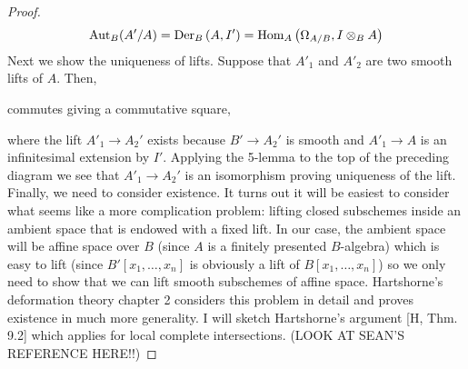 \documentclass[12pt]{article}
\begin{document}
\begin{proof}
\[ \mathrm{Aut}_B(A'/A) = \Der[B]{A}{I'} = \Hom{A}{\Omega_{A/B}}{I \otimes_B A} \]
Next we show the uniqueness of lifts. Suppose that $A'_1$ and $A'_2$ are two smooth lifts of $A$. Then,
\begin{center}
\end{center}
commutes giving a commutative square,
\begin{center}
\end{center}
where the lift $A'_1 \to A_2'$ exists because $B' \to A_2'$ is smooth and $A'_1 \to A$ is an infinitesimal extension by $I'$. Applying the 5-lemma to the top of the preceding diagram we see that $A'_1 \to A_2'$ is an isomorphism proving uniqueness of the lift.
\bigskip\\
Finally, we need to consider existence. It turns out it will be easiest to consider what seems like a more complication problem: lifting closed subschemes inside an ambient space that is endowed with a fixed lift. In our case, the ambient space will be affine space over $B$ (since $A$ is a finitely presented $B$-algebra) which is easy to lift (since $B'[x_1, \dots, x_n]$ is obviously a lift of $B[x_1, \dots, x_n]$) so we only need to show that we can lift smooth subschemes of affine space. Hartshorne's deformation theory chapter 2 considers this problem in detail and proves existence in much more generality. I will sketch Hartshorne's argument [H, Thm. 9.2] which applies for local complete intersections. (LOOK AT SEAN'S REFERENCE HERE!!)

\end{proof}
\end{document}
